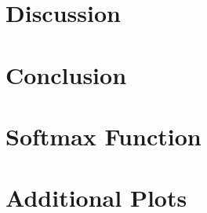 \documentclass[twocolumn, twoside, 10pt]{article}
\begin{document}
\section{Discussion}


\section{Conclusion}


\clearpage

\onecolumn
\printbibliography[heading=bibnumbered, title=References]
\clearpage

\appendix
\section{Softmax Function}

\clearpage

\section{Additional Plots}

\clearpage

% 

% 
\end{document}
